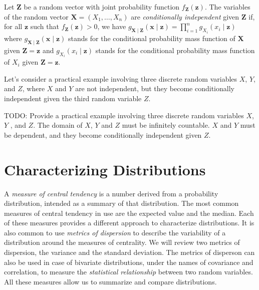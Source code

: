 \begin{definition}
Let $\mathbf{Z}$ be a random vector with joint probability function $f_\mathbf{Z} \left( \mathbf{z} \right)$. The variables of the random vector $\mathbf{X} = \left( X_{1}, \ldots, X_{n} \right)$ are \emph{conditionally independent} given $\mathbf{Z}$ if, for all $\mathbf{z}$ such that $f_\mathbf{Z}\left(\mathbf{z}\right)>0$, we have $g_{\mathbf{X} \mid \mathbf{Z}} \left(\mathbf{x}\mid\mathbf{z}\right)=\prod_{i=1}^{n}g_{X_i}\left(x_{i}\mid\mathbf{z}\right)$ where $g_{\mathbf{X} \mid \mathbf{Z}} \left( \mathbf{x} \mid \mathbf{z} \right)$ stands for the conditional probability mass function of $\mathbf{X}$ given $\mathbf{Z}=\mathbf{z}$ and $g_{X_i}\left(x_{i}\mid\mathbf{z}\right)$ stands for the conditional probability mass function of $X_{i}$ given $\mathbf{Z}=\mathbf{z}$.
\end{definition}

Let's consider a practical example involving three discrete random variables $X$, $Y$, and $Z$, where $X$ and $Y$ are not independent, but they become conditionally independent given the third random variable $Z$.

\begin{example}
{\color{red} TODO: Provide a practical example involving three discrete random variables $X$, $Y$ , and $Z$. The domain of $X$, $Y$ and $Z$ must be infinitely countable. $X$ and $Y$ must be dependent, and they become conditionally independent given $Z$.}
\end{example}


%
%

\section{Characterizing Distributions}
\label{sec:probability_expectation}

A \emph{measure of central tendency} is a number derived from a probability distribution, intended as a summary of that distribution. The most common measures of central tendency in use are the expected value and the median. Each of these measures provides a different approach to characterize distributions. It is also common to use \emph{metrics of dispersion} to describe the variability of a distribution around the measures of centrality. We will review two metrics of dispersion, the variance and the standard deviation. The metrics of disperson can also be used in case of bivariate distributions, under the names of covariance and correlation, to measure the \emph{statistical relationship} between two random variables. All these measures allow us to summarize and compare distributions.

